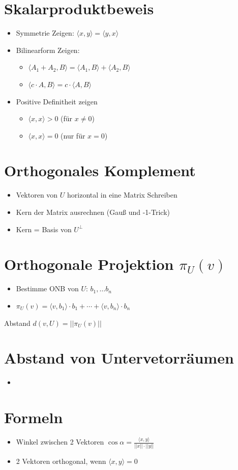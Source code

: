 \documentclass[a4paper,portrait]{scrartcl}
\begin{document}
\section{Skalarproduktbeweis}
\begin{itemize}
	\item Symmetrie Zeigen: $\langle x,y \rangle = \langle y,x \rangle$
	\item Bilinearform Zeigen:
	\begin{itemize}
		\item $\langle A_1+A_2,B\rangle = \langle A_1,B\rangle + \langle A_2,B\rangle$
		\item $\langle c \cdot A,B \rangle = c \cdot \langle A,B\rangle$
	\end{itemize}
	\item Positive Definitheit zeigen
	\begin{itemize}

		\item $\langle x,x \rangle > 0 $ (für $x \neq 0$)
		\item $\langle x,x \rangle = 0 $ (nur für $x = 0$)
	\end{itemize}
\end{itemize}
\section{Orthogonales Komplement}
\begin{itemize}
	\item Vektoren von $U$ horizontal in eine Matrix Schreiben
	\item Kern der Matrix ausrechnen (Gauß und -1-Trick)
	\item Kern = Basis von $U^\perp$
\end{itemize}
\section{Orthogonale Projektion $\pi_U(v)$}
\begin{itemize}
	\item Bestimme ONB von $U$: $b_1, \hdots b_n$
	\item $\pi_U(v) = \langle v,b_1\rangle \cdot b_1 + \cdots + \langle v,b_n\rangle \cdot b_n$
\end{itemize}
Abstand $d(v,U) = ||\pi_U(v)||$
\section{Abstand von Untervetorräumen}
\begin{itemize}
	\item 
\end{itemize}
\section{Formeln}
\begin{itemize}
	\item Winkel zwischen 2 Vektoren $\cos \alpha = \frac{\langle x,y \rangle}{||x|| \cdot ||y||}$
	\item 2 Vektoren orthogonal, wenn $\langle x,y \rangle = 0$
\end{itemize}
\end{document}
